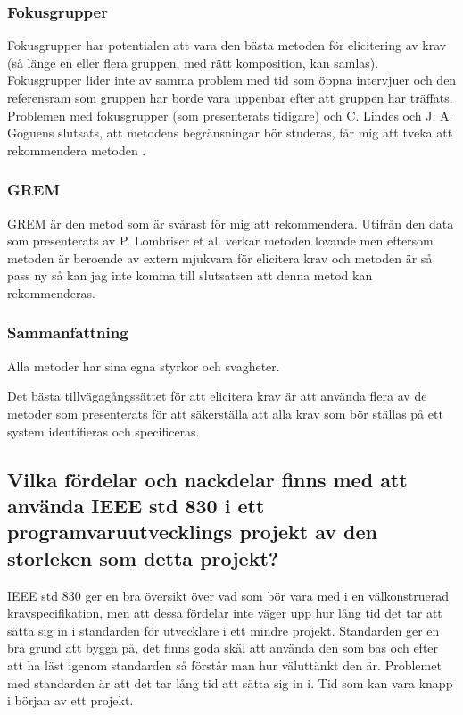 \subsubsection{Fokusgrupper}
Fokusgrupper har potentialen att vara den bästa metoden för elicitering av krav (så länge en eller flera gruppen, med rätt komposition, kan samlas). Fokusgrupper lider inte av samma problem med tid som öppna intervjuer och den referensram som gruppen har borde vara uppenbar efter att gruppen har träffats. Problemen med fokusgrupper (som presenterats tidigare) och C. Lindes och J. A. Goguens slutsats, att metodens begränsningar bör studeras, får mig att tveka att rekommendera metoden \cite{goguen1993techniques}.

\subsubsection{GREM}
GREM är den metod som är svårast för mig att rekommendera. Utifrån den data som presenterats av P. Lombriser et al. \cite{lombriser2016gamified} verkar metoden lovande men eftersom metoden är beroende av extern mjukvara för elicitera krav och metoden är så pass ny så kan jag inte komma till slutsatsen att denna metod kan rekommenderas.

\subsubsection{Sammanfattning}
Alla metoder har sina egna styrkor och svagheter.

Det bästa tillvägagångssättet för att elicitera krav är att använda flera av de metoder som presenterats för att säkerställa att alla krav som bör ställas på ett system identifieras och specificeras.        

\subsection{Vilka fördelar och nackdelar finns med att använda IEEE std 830 i ett programvaruutvecklings projekt av den storleken som detta projekt?}
IEEE std 830 ger en bra översikt över vad som bör vara med i en välkonstruerad kravspecifikation, men att dessa fördelar inte väger upp hur lång tid det tar att sätta sig in i standarden för utvecklare i ett mindre projekt. Standarden ger en bra grund att bygga på, det finns goda skäl att använda den som bas och efter att ha läst igenom standarden så förstår man hur väluttänkt den är. Problemet med standarden är att det tar lång tid att sätta sig in i. Tid som kan vara knapp i början av ett projekt. 
